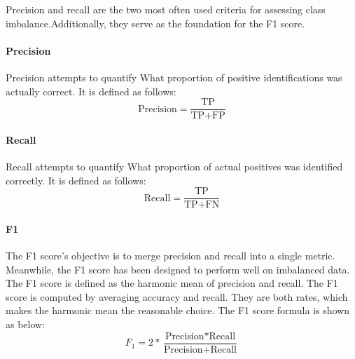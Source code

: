 Precision and recall are the two most often used criteria for assessing class imbalance.Additionally, they serve as the foundation for the F1 score. 
\paragraph{Precision}
Precision attempts to quantify What proportion of positive identifications was actually correct. It is defined as follows:
\[\text{Precision} = \frac{\text{TP}}{\text{TP} + \text{FP}}\]

\paragraph{Recall}
Recall attempts to quantify What proportion of actual positives was identified correctly. It is defined as follows:
\[\text{Recall} = \frac{\text{TP}}{\text{TP} + \text{FN}}\]



\paragraph{F1}
The F1 score's objective is to merge precision and recall into a single metric. Meanwhile, the F1 score has been designed to perform well on imbalanced data. 
The F1 score is defined as the harmonic mean of precision and recall. The F1 score is computed by averaging accuracy and recall. They are both rates, which makes  the harmonic mean the reasonable choice. The F1 score formula is shown as below:
\[F_{1}=2 * \frac{\text{Precision} * \text{Recall}}{\text{Precision} + \text{Recall}}\]









































